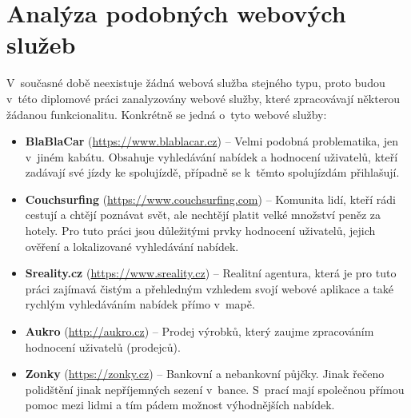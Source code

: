 \chapter{Analýza podobných webových služeb}
\label{analyza}

V~současné době neexistuje žádná webová služba stejného typu, proto budou v~této diplomové práci zanalyzovány webové služby, které zpracovávají některou žádanou funkcionalitu. Konkrétně se jedná o~tyto webové služby:
\begin{itemize}
	\item \textbf{BlaBlaCar} \cite{blablacar} (\url{https://www.blablacar.cz}) – Velmi podobná problematika, jen v~jiném kabátu. Obsahuje vyhledávání nabídek a hodnocení uživatelů, kteří zadávají své jízdy ke spolujízdě, případně se k~těmto spolujízdám přihlašují.
	\item \textbf{Couchsurfing} \cite{couchsurfing} (\url{https://www.couchsurfing.com}) – Komunita lidí, kteří rádi cestují a chtějí poznávat svět, ale nechtějí platit velké množství peněz za hotely. Pro tuto práci jsou důležitými prvky hodnocení uživatelů, jejich ověření a lokalizované vyhledávání nabídek.
	\item \textbf{Sreality.cz} \cite{sreality} (\url{https://www.sreality.cz}) – Realitní agentura, která je pro tuto práci zajímavá čistým a přehledným vzhledem svojí webové aplikace a také rychlým vyhledáváním nabídek přímo v~mapě.
	\item \textbf{Aukro} \cite{aukro} (\url{http://aukro.cz}) – Prodej výrobků, který zaujme zpracováním hodnocení uživatelů (prodejců).
	\item \textbf{Zonky} \cite{zonky} (\url{https://zonky.cz}) – Bankovní a nebankovní půjčky. Jinak řečeno polidštění jinak nepříjemných sezení v~bance. S~prací mají společnou přímou pomoc mezi lidmi a tím pádem možnost výhodnějších nabídek.
\end{itemize}

\newpage

\newpage

\newpage

\newpage

\newpage

